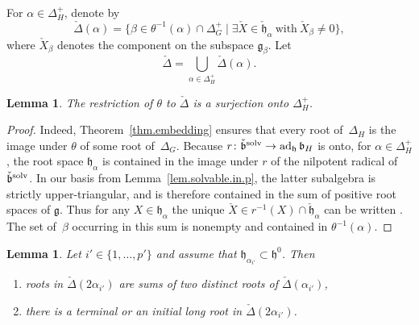 \documentclass[pdftex]{sigma}
\numberwithin{equation}{section}
\newtheorem{lem}[thm]{Lemma}
\theoremstyle{definition}
\newcommand{\lieg}{\mathfrak{g}}
\newcommand{\lieh}{\mathfrak{h}}
\def\h{{\mathfrak h}}
\def\b{{\mathfrak b}}
\begin{document}
For $\alpha \in \Delta_H^+$, denote by
\[\check{\Delta}(\alpha) = \bigl\{ \beta \in \theta^{-1}(\alpha) \cap \Delta_G^+ \mid \exists \check{X} \in \check{\lieh}_\alpha \ \mbox{with} \ \check{X}_\beta \neq 0 \bigr\},\]
where $\check{X}_\beta$ denotes the component on the subspace $\lieg_\beta$.
 Let
 \[\check{\Delta} = \bigcup_{\alpha \in \Delta_H^+} \check{\Delta}(\alpha).\]
\begin{lem}
 The restriction of $\theta$ to $\check{\Delta}$ is a surjection onto $\Delta_H^+$.
 \end{lem}

 \begin{proof}
 Indeed, Theorem~\ref{thm.embedding} ensures that every root of~$\Delta_H$ is the image under $\theta$ of some root of~$\Delta_G$.
Because $r \colon \check{\b}^{\rm solv} \rightarrow \operatorname{ad}_\h \b_H$ is onto, for $\alpha \in \Delta_H^+$, the root space $\lieh_\alpha$ is contained in the
image under $r$ of the nilpotent radical
 of $\check{\b}^{\rm solv}$. In our basis from Lemma~\ref{lem.solvable.in.p}, the latter subalgebra is strictly upper-triangular,
and is therefore contained in the sum of positive root spaces of $\lieg$. Thus for any $X \in \lieh_\alpha$ the unique $\check{X} \in r^{-1}(X) \cap \check{\lieh}_\alpha$ can be written . The set of~$\beta$ occurring in this sum is nonempty and contained in $\theta^{-1}(\alpha)$.
\end{proof}

\begin{lem}\label{lem.root.lifts}
Let $i' \in \{ 1, \dots, p' \}$ and assume that $\lieh_{ \alpha_{i'}} \subset \lieh^0$. Then
\begin{enumerate}\itemsep=0pt
\item[$(1)$] roots in $\check{\Delta} (2 \alpha_{i'} )$ are sums of two distinct roots of $\check{\Delta}(\alpha_{i'})$,
\item[$(2)$] there is a terminal or an initial long root in $\check{\Delta}(2 \alpha_{i'})$.
\end{enumerate}
\end{lem}
\end{document}
